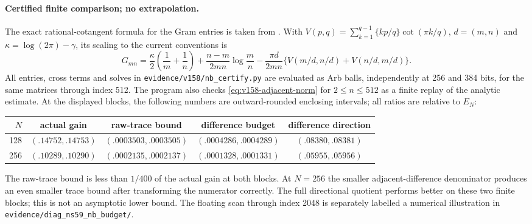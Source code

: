 \documentclass[11pt]{article}
\theoremstyle{remark}
\begin{document}
\paragraph{Certified finite comparison; no extrapolation.}
The exact rational-cotangent formula for the Gram entries is taken from
\cite[Proposition 89]{BaezDuarteAutocorrelation2003}. With
$V(p,q)=\sum_{k=1}^{q-1}\{kp/q\}\cot(\pi k/q)$, $d=(m,n)$ and
$\kappa=\log(2\pi)-\gamma$, its scaling to the current conventions is
\begin{equation}
 G_{mn}=\frac\kappa2\left(\frac1m+\frac1n\right)
 +\frac{n-m}{2mn}\log\frac mn
 -\frac{\pi d}{2mn}\{V(m/d,n/d)+V(n/d,m/d)\}.
 \label{eq:v158-cot-gram}
\end{equation}
All entries, cross terms and solves in \texttt{evidence/v158/nb\_certify.py}
are evaluated as Arb balls, independently at 256 and 384 bits, for the
same matrices through index 512. The program also checks
\eqref{eq:v158-adjacent-norm} for $2\leq n\leq512$ as a finite replay
of the analytic estimate. At the displayed blocks, the following numbers
are outward-rounded enclosing intervals; all ratios are relative to $E_N$:
\begin{center}
\begin{tabular}{rcccc}
\toprule
$N$ & actual gain & raw-trace bound & difference budget & difference direction\\
\midrule
128 & $(.14752,.14753)$ & $(.0003503,.0003505)$
    & $(.0004286,.0004289)$ & $(.08380,.08381)$\\
256 & $(.10289,.10290)$ & $(.0002135,.0002137)$
    & $(.0001328,.0001331)$ & $(.05955,.05956)$\\
\bottomrule
\end{tabular}
\end{center}
The raw-trace bound is less than $1/400$ of the actual gain at both
blocks. At $N=256$ the smaller adjacent-difference denominator produces
an even smaller trace bound after transforming the numerator correctly.
The full directional quotient performs better on these two finite blocks;
this is not an asymptotic lower bound. The floating scan through index
2048 is separately labelled a numerical illustration in
\texttt{evidence/diag\_ns59\_nb\_budget/}.
\end{document}
